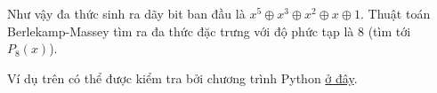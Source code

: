 \begin{example}
	Như vậy đa thức sinh ra dãy bit ban đầu là $x^5 \oplus x^3 \oplus x^2 \oplus x \oplus 1$. Thuật toán Berlekamp-Massey tìm ra đa thức đặc trưng với độ phức tạp là 8 (tìm tới $P_8(x)$).

\end{example}

Ví dụ trên có thể được kiểm tra bởi chương trình Python \href{https://github.com/dunglq2000/lfsr-berlekamp-massey}{ở đây}.